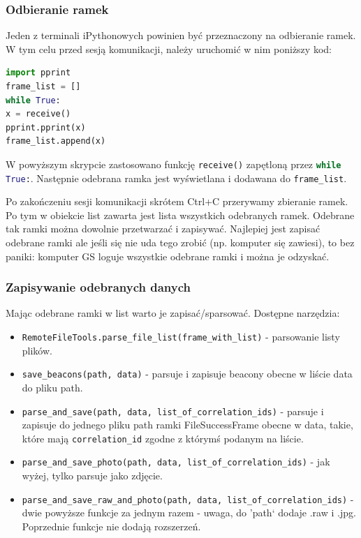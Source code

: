 \subsubsection{Odbieranie ramek}
Jeden z terminali iPythonowych powinien być przeznaczony na odbieranie ramek. W tym celu przed sesją komunikacji, należy uruchomić w nim poniższy kod:

\begin{lstlisting}[language=Python]
import pprint
frame_list = []
while True:
x = receive()
pprint.pprint(x)
frame_list.append(x)
\end{lstlisting}

W powyższym skrypcie zastosowano funkcję \lstinline[language=Python]{receive()} zapętloną przez \lstinline[language=Python]{while True:}. Następnie odebrana ramka jest wyświetlana i dodawana do \lstinline{frame_list}.

Po zakończeniu sesji komunikacji skrótem Ctrl+C przerywamy zbieranie ramek. Po tym w obiekcie list zawarta jest lista wszystkich odebranych ramek. Odebrane tak ramki można dowolnie przetwarzać i zapisywać. Najlepiej jest zapisać odebrane ramki ale jeśli się nie uda tego zrobić (np. komputer się zawiesi), to bez paniki: komputer GS loguje wszystkie odebrane ramki i można je odzyskać.

\subsubsection{Zapisywanie odebranych danych}
Mając odebrane ramki w list warto je zapisać/sparsować. Dostępne narzędzia:

\begin{itemize}
	\item \lstinline{RemoteFileTools.parse_file_list(frame_with_list)} - parsowanie listy plików.
	\item \lstinline{save_beacons(path, data)} - parsuje i zapisuje beacony obecne w liście data do pliku path.
	\item \lstinline{parse_and_save(path, data, list_of_correlation_ids)} - parsuje i zapisuje do jednego pliku path ramki FileSuccessFrame obecne w data, takie, które mają \lstinline{correlation_id} zgodne z którymś podanym na liście.
	\item \lstinline{parse_and_save_photo(path, data, list_of_correlation_ids)} - jak wyżej, tylko parsuje jako zdjęcie.
	\item \lstinline{parse_and_save_raw_and_photo(path, data, list_of_correlation_ids)} - dwie powyższe funkcje za jednym razem - uwaga, do 'path` dodaje .raw i .jpg. Poprzednie funkcje nie dodają rozszerzeń.
\end{itemize}